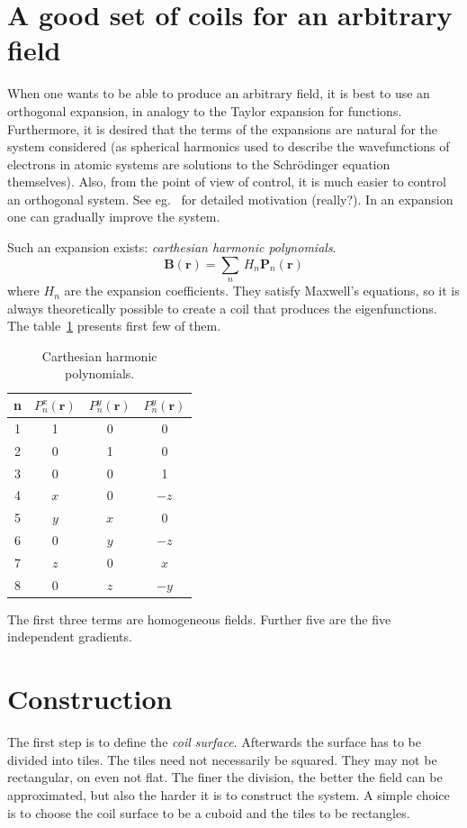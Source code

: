 \section{A good set of coils for an arbitrary field}
When one wants to be able to produce an arbitrary field, it is best to use an orthogonal expansion, in analogy to the Taylor expansion for functions. Furthermore, it is desired that the terms of the expansions are natural for the system considered (as spherical harmonics used to describe the wavefunctions of electrons in atomic systems are solutions to the Schrödinger equation themselves). Also, from the point of view of control, it is much easier to control an orthogonal system. See eg. \,\citep{Branch1984} for detailed motivation (really?). In an expansion one can gradually improve the system.

Such an expansion exists: \emph{carthesian harmonic polynomials}.
\begin{equation}
  \mathbf{B}(\mathbf{r}) = \sum_{n}\,H_n\mathbf{P}_n(\mathbf{r})
\end{equation}
where $H_n$ are the expansion coefficients. They satisfy Maxwell's equations, so it is always theoretically possible to create a coil that produces the eigenfunctions. The table~\ref{tab:coils_carthesian_harmonics} presents first few of them.

\begin{table}
  \centering
  \begin{tabular}{c|ccc}
    n & $P_n^x(\mathbf{r})$ & $P_n^y(\mathbf{r})$ & $P_n^y(\mathbf{r})$ \\ \hline
    1 & 1 & 0 & 0 \\
    2 & 0 & 1 & 0 \\
    3 & 0 & 0 & 1 \\ \hline
    4 & $x$ &  0  & $-z$ \\
    5 & $y$ & $x$ &   0  \\
    6 &  0  & $y$ & $-z$ \\
    7 & $z$ &  0  & $ x$ \\
    8 &  0  & $z$ & $-y$ \\
  \end{tabular}
  \caption{Carthesian harmonic polynomials.}
  \label{tab:coils_carthesian_harmonics}
\end{table}

The first three terms are homogeneous fields. Further five are the five independent gradients.


\section{Construction}
The first step is to define the \emph{coil surface}. Afterwards the surface has to be divided into tiles. The tiles need not necessarily be squared. They may not be rectangular, on even not flat. The finer the division, the better the field can be approximated, but also the harder it is to construct the system. A simple choice is to choose the coil surface to be a cuboid and the tiles to be rectangles.


